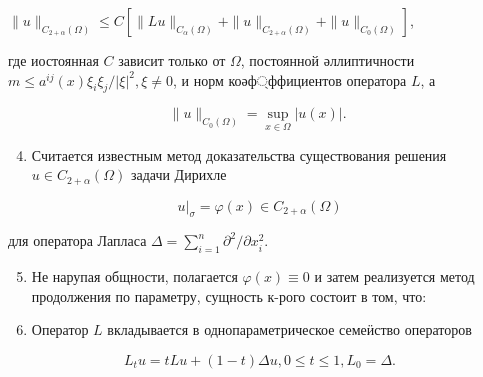 \documentclass[10pt]{article}
\begin{document}
$\|u\|_{C_{2+\alpha}(\Omega)} \leqslant C\left[\|L u\|_{C_{\alpha}(\Omega)}+\|u\|_{C_{2+\alpha}(\Omega)}+\|u\|_{C_{0}(\Omega)}\right]$,



где иостоянная $C$ зависит только от $\Omega$, постоянной әллиптичности $m \leqslant a^{i j}(x) \xi_{i} \xi_{j} /|\xi|^{2}, \xi \neq 0$, и норм коәф্ффициентов оператора $L$, а



\[

\|u\|_{C_{0}(\Omega)}=\sup _{x \in \Omega}|u(x)| \text {. }

\]



\begin{enumerate}

  \setcounter{enumi}{3}

  \item Считается известным метод доказательства существования решения $u \in C_{2+\alpha}(\Omega)$ задачи Дирихле

\end{enumerate}



\[

\left.u\right|_{\sigma}=\varphi(x) \in C_{2+\alpha}(\Omega)

\]



для оператора Лапласа $\Delta=\sum_{i=1}^{n} \partial^{2} / \partial x_{i}^{2}$.



\begin{enumerate}

  \setcounter{enumi}{4}

  \item Не нарупая общности, полагается $\varphi(x) \equiv 0$ и затем реализуется метод продолжения по параметру, сущность к-рого состоит в том, что:



  \item Оператор $L$ вкладывается в однопараметрическое семеӥство операторов



\end{enumerate}



\[

L_{t} u=t L u+(1-t) \Delta u, 0 \leqslant t \leqslant 1, L_{0}=\Delta .

\]
\end{document}
